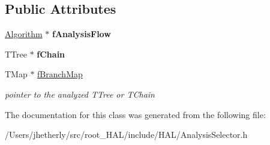 \subsection*{Public Attributes}
\begin{DoxyCompactItemize}
\item 
\hypertarget{class_h_a_l_1_1_analysis_selector_a7634b6d0eb916c352968a1a6acd7f3d2}{\hyperlink{class_h_a_l_1_1_algorithm}{Algorithm} $\ast$ {\bfseries f\+Analysis\+Flow}}\label{class_h_a_l_1_1_analysis_selector_a7634b6d0eb916c352968a1a6acd7f3d2}

\item 
\hypertarget{class_h_a_l_1_1_analysis_selector_a37f6980439f0b1e94db036220eacef8f}{T\+Tree $\ast$ {\bfseries f\+Chain}}\label{class_h_a_l_1_1_analysis_selector_a37f6980439f0b1e94db036220eacef8f}

\item 
\hypertarget{class_h_a_l_1_1_analysis_selector_a4d6e0e029b502012c4bf6d4f1618625c}{T\+Map $\ast$ \hyperlink{class_h_a_l_1_1_analysis_selector_a4d6e0e029b502012c4bf6d4f1618625c}{f\+Branch\+Map}}\label{class_h_a_l_1_1_analysis_selector_a4d6e0e029b502012c4bf6d4f1618625c}

\begin{DoxyCompactList}\small\item\em pointer to the analyzed T\+Tree or T\+Chain \end{DoxyCompactList}\end{DoxyCompactItemize}


The documentation for this class was generated from the following file\+:\begin{DoxyCompactItemize}
\item 
/\+Users/jhetherly/src/root\+\_\+\+H\+A\+L/include/\+H\+A\+L/Analysis\+Selector.\+h\end{DoxyCompactItemize}

